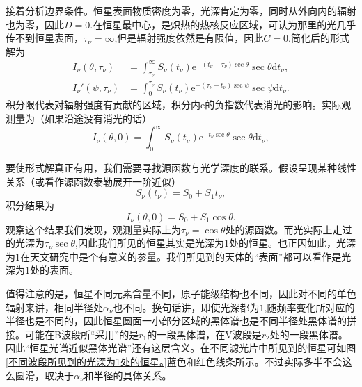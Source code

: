 \documentclass[../天体物理基础.tex]{subfiles}
\begin{document}
接着分析边界条件。恒星表面物质密度为零，光深肯定为零，同时从外向内的辐射也为零，因此$D=0$.在恒星最中心，是炽热的热核反应区域，可认为那里的光几乎传不到恒星表面，$\tau_{\nu}=\infty$,但是辐射强度依然是有限值，因此$C=0$.简化后的形式解为
\begin{align}
I_\nu(\theta,\tau_\nu)&=\int_{\tau_\nu}^{\infty}S_\nu(t_\nu)\mathrm{e}^{-(t_\nu-\tau_\nu) \sec\theta}\sec\theta\mathrm{d}t_\nu,\\
I_\nu'(\psi,\tau_\nu)&=\int_0^{\tau_\nu}S_\nu(t_\nu)\mathrm{e}^{-(\tau_\nu-t_\nu)\sec\psi}\sec\psi\mathrm{d}t_\nu.
\end{align}
积分限代表对辐射强度有贡献的区域，积分内$\mathrm{e}$​的负指数代表消光的影响。实际观测量为（如果沿途没有消光的话）
\begin{equation}
I_\nu(\theta,0)=\int_{0}^{\infty}S_\nu(t_\nu)\mathrm{e}^{-t_\nu\sec\theta}\sec\theta\mathrm{d}t_\nu,
\end{equation}

要使形式解真正有用，我们需要寻找源函数与光学深度的联系。假设呈现某种线性关系（或看作源函数泰勒展开一阶近似）
\begin{equation}
S_{\nu}\left(t_{\nu}\right)=S_{0}+S_{1}t_{\nu},
\end{equation}
积分结果为
\begin{equation}
I_\nu(\theta,0)=S_{0}+S_{1}\cos\theta.
\end{equation}
观察这个结果我们发现，观测量实际上为$\tau_{\nu}=\cos\theta$处的源函数。而光实际上走过的光深为$\tau_{\nu}\sec\theta$,因此我们所见的恒星其实是光深为$1$处的恒星。也正因如此，光深为$1$在天文研究中是个有意义的参量。我们所见到的天体的“表面”都可以看作是光深为$1$处的表面。

值得注意的是，恒星不同元素含量不同，原子能级结构也不同，因此对不同的单色辐射来讲，相同半径处$\alpha_{\nu}$也不同。换句话讲，即使光深都为$1$,随频率变化所对应的半径也是不同的，因此恒星圆面一小部分区域的黑体谱也是不同半径处黑体谱的拼接。可能在B波段所“采用”的是$r_{1}$的一段黑体谱，在V波段是$r_{2}$处的一段黑体谱。因此“恒星光谱近似黑体光谱”还有这层含义。在不同滤光片中所见到的恒星可如图\ref{不同波段所见到的光深为1处的恒星。}蓝色和红色线条所示。不过实际多半不会这么圆滑，取决于$\alpha_{\nu}$和半径的具体关系。
\end{document}
